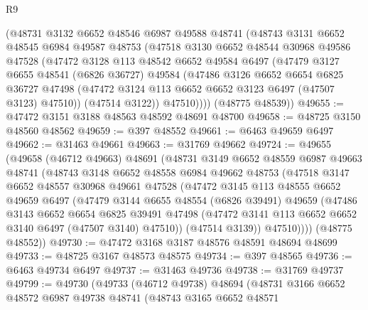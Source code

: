 \begin{lexlean}{R9}
\begin{coremodule}
      (@48731
        @3132
        @6652
        @48546
        @6987
        @49588
        @48741
        (@48743
          @3131
          @6652
          @48545
          @6984
          @49587
          @48753
          (@47518
            @3130
            @6652
            @48544
            @30968
            @49586
            @47528
            (@47472
              @3128
              @113
              @48542
              @6652
              @49584
              @6497
              (@47479
                @3127
                @6655
                @48541
                (@6826 @36727)
                @49584
                (@47486
                  @3126
                  @6652
                  @6654
                  @6825
                  @36727
                  @47498
                  (@47472 @3124 @113 @6652 @6652 @3123 @6497 (@47507 @3123) @47510))
                (@47514 @3122))
              @47510))))
      (@48775 @48539))
@49655 := @47472 @3151 @3188 @48563 @48592 @48691 @48700
@49658 := @48725 @3150 @48560 @48562
@49659 := @397 @48552
@49661 := @6463 @49659 @6497
@49662 := @31463 @49661
@49663 := @31769 @49662
@49724 := @49655
    (@49658
      (@46712 @49663)
      @48691
      (@48731
        @3149
        @6652
        @48559
        @6987
        @49663
        @48741
        (@48743
          @3148
          @6652
          @48558
          @6984
          @49662
          @48753
          (@47518
            @3147
            @6652
            @48557
            @30968
            @49661
            @47528
            (@47472
              @3145
              @113
              @48555
              @6652
              @49659
              @6497
              (@47479
                @3144
                @6655
                @48554
                (@6826 @39491)
                @49659
                (@47486
                  @3143
                  @6652
                  @6654
                  @6825
                  @39491
                  @47498
                  (@47472 @3141 @113 @6652 @6652 @3140 @6497 (@47507 @3140) @47510))
                (@47514 @3139))
              @47510))))
      (@48775 @48552))
@49730 := @47472 @3168 @3187 @48576 @48591 @48694 @48699
@49733 := @48725 @3167 @48573 @48575
@49734 := @397 @48565
@49736 := @6463 @49734 @6497
@49737 := @31463 @49736
@49738 := @31769 @49737
@49799 := @49730
    (@49733
      (@46712 @49738)
      @48694
      (@48731
        @3166
        @6652
        @48572
        @6987
        @49738
        @48741
        (@48743
          @3165
          @6652
          @48571

\end{coremodule}
\end{lexlean}
